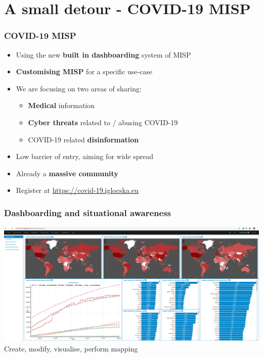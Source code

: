 \section{A small detour - COVID-19 MISP}

\begin{frame}
 \frametitle{COVID-19 MISP}
 \begin{itemize}
         \item Using the new {\bf built in dashboarding} system of MISP
         \item {\bf Customising MISP} for a specific use-case
         \item We are focusing on two areas of sharing:
         \begin{itemize}
              \item {\bf Medical} information
              \item {\bf Cyber threats} related to / abusing COVID-19
              \item COVID-19 related {\bf disinformation}
         \end{itemize}
         \item Low barrier of entry, aiming for wide spread
         \item Already a {\bf massive community}
         \item Register at \url{https://covid-19.iglocska.eu}
 \end{itemize}
\end{frame}

\begin{frame}
    \frametitle{Dashboarding and situational awareness}
    \includegraphics[width=1.00\linewidth]{covid.png}
    Create, modify, visualise, perform mapping
\end{frame}

